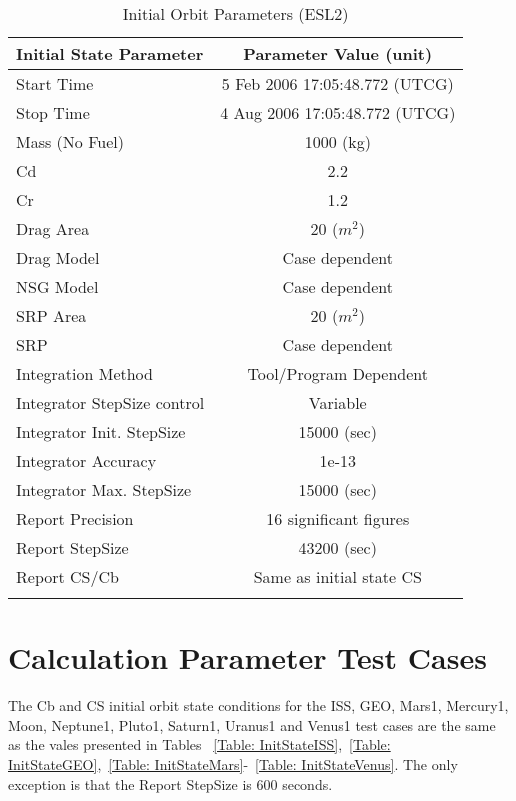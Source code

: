 \begin{table}[htbp!]
\centering \caption{Initial Orbit Parameters (ESL2)}
      \begin{tabular}{lc}
      \hline\hline
            Initial State Parameter & Parameter Value (unit)\\
            \hline
            Start Time & 5 Feb 2006 17:05:48.772 (UTCG)\\
            Stop Time & 4 Aug 2006 17:05:48.772 (UTCG)\\
            
            Mass (No Fuel) & 1000 (kg)\\
            Cd & 2.2\\
            Cr & 1.2\\
            Drag Area & 20 ($m^2$)\\
            Drag Model & Case dependent\\
            NSG Model & Case dependent\\
            SRP Area & 20 ($m^2$)\\
            SRP & Case dependent\\
            Integration Method & Tool/Program Dependent\\
            Integrator StepSize control & Variable\\
            Integrator Init. StepSize & 15000 (sec)\\
            Integrator Accuracy & 1e-13\\
            Integrator Max. StepSize & 15000 (sec)\\
            Report Precision & 16 significant figures\\
            Report StepSize & 43200 (sec)\\
            Report CS/Cb & Same as initial state CS\\
      \hline\hline
      \label{Table: InitStateESL2}
\end{tabular}
\end{table}

\clearpage
\section{Calculation Parameter Test Cases}

The Cb and CS initial orbit state conditions for
the ISS, GEO, Mars1, Mercury1, Moon, Neptune1,
Pluto1, Saturn1, Uranus1 and Venus1 test cases are the same as the
vales presented in Tables ~\ref{Table: InitStateISS},~\ref{Table:
InitStateGEO},~\ref{Table: InitStateMars}-~\ref{Table:
InitStateVenus}. The only exception is that the Report StepSize is
600 seconds.

